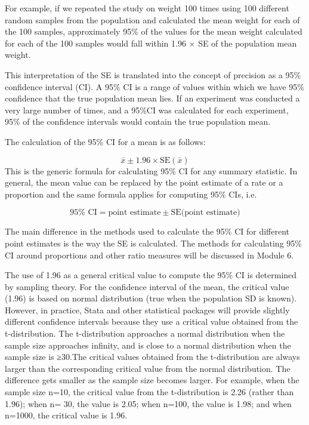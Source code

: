\documentclass[
]{memoir}
\begin{document}
For example, if we repeated the study on weight 100 times using 100 different random samples from the population and calculated the mean weight for each of the 100 samples, approximately 95\% of the values for the mean weight calculated for each of the 100 samples would fall within 1.96 × SE of the population mean weight.

This interpretation of the SE is translated into the concept of precision as a 95\% confidence interval (CI). A 95\% CI is a range of values within which we have 95\% confidence that the true population mean lies. If an experiment was conducted a very large number of times, and a 95\%CI was calculated for each experiment, 95\% of the confidence intervals would contain the true population mean.

The calculation of the 95\% CI for a mean is as follows:

\[  \bar{x} \pm 1.96 \times \text{SE}( \bar{x} ) \]
This is the generic formula for calculating 95\% CI for any summary statistic. In general, the mean value can be replaced by the point estimate of a rate or a proportion and the same formula applies for computing 95\% CIs, i.e.

\[ 95\% \text{ CI} = \text{point estimate} \pm \text{SE}(\text{point estimate)} \]

The main difference in the methods used to calculate the 95\% CI for different point estimates is the way the SE is calculated. The methods for calculating 95\% CI around proportions and other ratio measures will be discussed in Module 6.

The use of 1.96 as a general critical value to compute the 95\% CI is determined by sampling theory. For the confidence interval of the mean, the critical value (1.96) is based on normal distribution (true when the population SD is known). However, in practice, Stata and other statistical packages will provide slightly different confidence intervals because they use a critical value obtained from the t-distribution. The t-distribution approaches a normal distribution when the sample size approaches infinity, and is close to a normal distribution when the sample size is ≥30.The critical values obtained from the t-distribution are always larger than the corresponding critical value from the normal distribution. The difference gets smaller as the sample size becomes larger. For example, when the sample size n=10, the critical value from the t-distribution is 2.26 (rather than 1.96); when n= 30, the value is 2.05; when n=100, the value is 1.98; and when n=1000, the critical value is 1.96.
\end{document}
